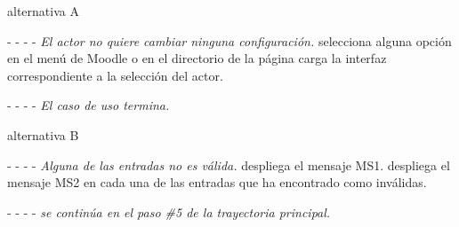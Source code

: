 \begin{UCtrayectoria}{alternativa A}
    \item[- -] - - {\em El actor no quiere cambiar ninguna configuración.}
    \actor selecciona alguna opción en el menú de Moodle o en el directorio de la página
    \sistema carga la interfaz correspondiente a la selección del actor.
    \item[- -] - - {\em El caso de uso termina.}
\end{UCtrayectoria}


\begin{UCtrayectoria}{alternativa B}
    \item[- -] - - {\em Alguna de las entradas no es válida.}
    \sistema despliega el mensaje MS1.
    \sistema despliega el mensaje MS2 en cada una de las entradas que ha encontrado como inválidas.
    
    \item[- -] - - {\em se continúa en el paso \#5 de la trayectoria principal.}
\end{UCtrayectoria}


\vfill\clearpage